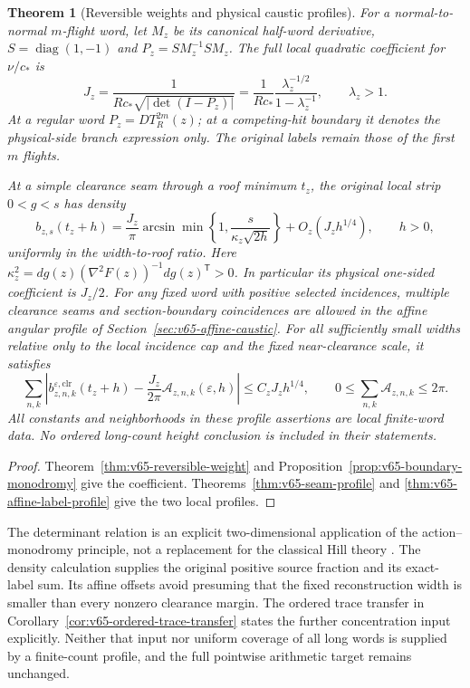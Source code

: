 \documentclass[11pt,reqno]{amsart}
\numberwithin{equation}{section}
\newtheorem{leadtheorem}{Theorem}
\theoremstyle{definition}\newtheorem{definition}[theorem]{Definition}
\theoremstyle{remark}\newtheorem{remark}[theorem]{Remark}
\begin{document}
\begin{leadtheorem}[Reversible weights and physical caustic profiles]
\label{thm:intro-v65-caustic}
For a normal-to-normal $m$-flight word, let $M_z$ be its canonical
half-word derivative, $S=\operatorname{diag}(1,-1)$ and
$P_z=S M_z^{-1}S M_z$. The full local quadratic coefficient for
$\nu/c_*$ is
\[
 J_z=\frac{1}{R c_*\sqrt{|\det(I-P_z)|}}
     =\frac{1}{R c_*}\frac{\lambda_z^{-1/2}}{1-\lambda_z^{-1}},
          \qquad\lambda_z>1.
\]
At a regular word $P_z=D T_R^{2m}(z)$; at a competing-hit boundary
it denotes the physical-side branch expression only. The original
labels remain those of the first $m$ flights.

At a simple clearance seam through a roof minimum $t_z$, the
original local strip $0<g<s$ has density
\[
 b_{z,s}(t_z+h)=\frac{J_z}{\pi}
     \arcsin\!\min\left\{1,\frac{s}{\kappa_z\sqrt{2h}}\right\}
          +O_z(J_zh^{1/4}),\qquad h>0,
\]
uniformly in the width-to-roof ratio. Here
$\kappa_z^2=dg(z)(\nabla^2F(z))^{-1}dg(z)^{\mathsf T}>0$.
In particular its physical one-sided coefficient is $J_z/2$.
For any fixed word with positive selected incidences, multiple
clearance seams and section-boundary coincidences are allowed in
the affine angular profile of Section~\ref{sec:v65-affine-caustic}.
For all sufficiently small widths relative only to the local
incidence cap and the fixed near-clearance scale, it satisfies
\[
 \sum_{n,k}\left|b_{z,n,k}^{\varepsilon,\mathrm{clr}}(t_z+h)
       -\frac{J_z}{2\pi}\mathcal A_{z,n,k}(\varepsilon,h)\right|
                    \le C_zJ_zh^{1/4},\qquad
          0\le\sum_{n,k}\mathcal A_{z,n,k}\le2\pi.
\]
All constants and neighborhoods in these profile assertions are local
finite-word data. No ordered long-count height conclusion is included
in their statements.
\end{leadtheorem}
\begin{proof}
Theorem~\ref{thm:v65-reversible-weight} and
Proposition~\ref{prop:v65-boundary-monodromy} give the coefficient.
Theorems~\ref{thm:v65-seam-profile} and
\ref{thm:v65-affine-label-profile} give the two local profiles.
\end{proof}

The determinant relation is an explicit two-dimensional application
of the action--monodromy principle, not a replacement for the
classical Hill theory \cite{BT65}. The density calculation supplies
the original positive source fraction and its exact-label sum.
Its affine offsets avoid presuming that the fixed reconstruction
width is smaller than every nonzero clearance margin. The ordered
trace transfer in Corollary~\ref{cor:v65-ordered-trace-transfer}
states the further concentration input explicitly. Neither that input
nor uniform coverage of all long words is supplied by a finite-count
profile, and the full pointwise arithmetic target remains unchanged.
\end{document}
